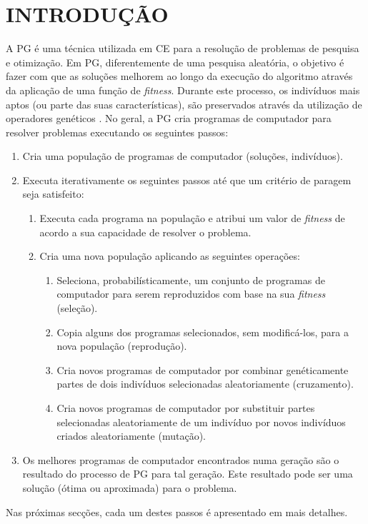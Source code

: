 \section{INTRODUÇÃO}
\label{sec:2introducao}

A \ac{PG} é uma técnica utilizada em \ac{CE} para a resolução de problemas de pesquisa e otimização. 
Em \ac{PG}, diferentemente de uma pesquisa aleatória, o objetivo é fazer com que as soluções melhorem ao longo da execução do
algoritmo através da aplicação de uma função de \emph{fitness}. Durante este processo, os indivíduos mais aptos (ou parte das suas 
características), são preservados através da utilização de operadores genéticos \citep{Koza1992}. No geral, a \ac{PG} cria 
programas de computador para resolver problemas executando os seguintes passos:

\begin{enumerate}
	\item{Cria uma população de programas de computador (soluções, indivíduos).}
  	\item{Executa iterativamente os seguintes passos até que um critério de paragem seja satisfeito:}
  	\begin{enumerate}
    	\item{Executa cada programa na população e atribui um valor de \emph{fitness} de acordo a sua capacidade de resolver
    	o problema.}
    	\item{Cria uma nova população aplicando as seguintes operações:}
    	\begin{enumerate}
    		\item{Seleciona, probabilísticamente, um conjunto de programas de computador para serem reproduzidos com base na
    		sua \emph{fitness} (seleção).}
    		\item{Copia alguns dos programas selecionados, sem modificá-los, para a nova população (reprodução).}
    		\item{Cria novos programas de computador por combinar genéticamente partes de dois indivíduos selecionadas 
    		aleatoriamente (cruzamento).}
    		\item{Cria novos programas de computador por substituir partes selecionadas aleatoriamente de um indivíduo por
    		novos indivíduos criados aleatoriamente (mutação).}
    	\end{enumerate}
  	\end{enumerate}
  	\item{Os melhores programas de computador encontrados numa geração são o resultado do processo de \ac{PG} para tal geração.
  	Este resultado pode ser uma solução (ótima ou aproximada) para o problema.}
\end{enumerate}

Nas próximas secções, cada um destes passos é apresentado em mais detalhes.
